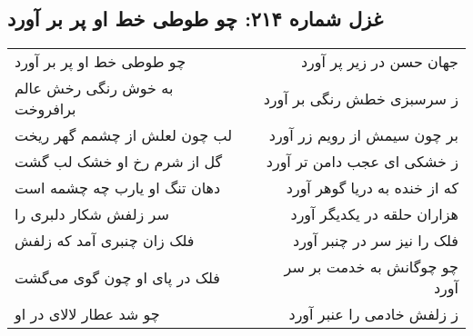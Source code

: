 \begin{center}
\section*{غزل شماره ۲۱۴: چو طوطی خط او پر بر آورد}
\label{sec:214}
\begin{longtable}{l p{0.5cm} r}
چو طوطی خط او پر بر آورد
&&
جهان حسن در زیر پر آورد
\\
به خوش رنگی رخش عالم برافروخت
&&
ز سرسبزی خطش رنگی بر آورد
\\
لب چون لعلش از چشمم گهر ریخت
&&
بر چون سیمش از رویم زر آورد
\\
گل از شرم رخ او خشک لب گشت
&&
ز خشکی ای عجب دامن تر آورد
\\
دهان تنگ او یارب چه چشمه است
&&
که از خنده به دریا گوهر آورد
\\
سر زلفش شکار دلبری را
&&
هزاران حلقه در یکدیگر آورد
\\
فلک زان چنبری آمد که زلفش
&&
فلک را نیز سر در چنبر آورد
\\
فلک در پای او چون گوی می‌گشت
&&
چو چوگانش به خدمت بر سر آورد
\\
چو شد عطار لالای در او
&&
ز زلفش خادمی را عنبر آورد
\\
\end{longtable}
\end{center}
